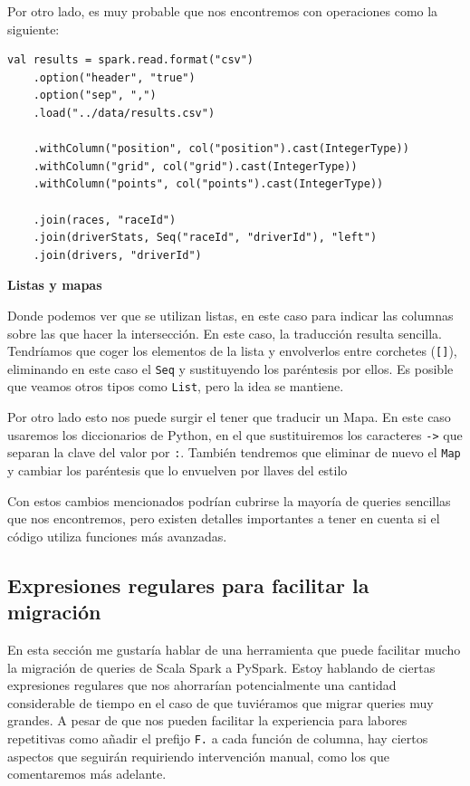 \documentclass[12pt,twoside,titlepage]{report}
\begin{document}
Por otro lado, es muy probable que nos encontremos con operaciones como la siguiente:

\begin{lstlisting}
val results = spark.read.format("csv")
	.option("header", "true")
	.option("sep", ",")
	.load("../data/results.csv")

	.withColumn("position", col("position").cast(IntegerType))    
	.withColumn("grid", col("grid").cast(IntegerType))    
	.withColumn("points", col("points").cast(IntegerType))

	.join(races, "raceId")
	.join(driverStats, Seq("raceId", "driverId"), "left")
	.join(drivers, "driverId")
\end{lstlisting}

\textbf{Listas y mapas}

Donde podemos ver que se utilizan listas, en este caso para indicar las columnas sobre las que hacer la intersección. En este caso, la traducción resulta sencilla. Tendríamos que coger los elementos de la lista y envolverlos entre corchetes (\texttt{[]}), eliminando en este caso el \texttt{Seq} y sustituyendo los paréntesis por ellos. Es posible que veamos otros tipos como \texttt{List}, pero la idea se mantiene.

Por otro lado esto nos puede surgir el tener que traducir un Mapa. En este caso usaremos los diccionarios de Python, en el que sustituiremos los caracteres \texttt{->} que separan la clave del valor por \texttt{:}. También tendremos que eliminar de nuevo el \texttt{Map} y cambiar los paréntesis que lo envuelven por llaves del estilo \texttt{{}}

Con estos cambios mencionados podrían cubrirse la mayoría de queries sencillas que nos encontremos, pero existen detalles importantes a tener en cuenta si el código utiliza funciones más avanzadas.

\subsection{Expresiones regulares para facilitar la migración}

En esta sección me gustaría hablar de una herramienta que puede facilitar mucho la migración de queries de Scala Spark a PySpark. Estoy hablando de ciertas expresiones regulares que nos ahorrarían potencialmente una cantidad considerable de tiempo en el caso de que tuviéramos que migrar queries muy grandes. A pesar de que nos pueden facilitar la experiencia para labores repetitivas como añadir el prefijo \texttt{F.} a cada función de columna, hay ciertos aspectos que seguirán requiriendo intervención manual, como los que comentaremos más adelante.
\end{document}
